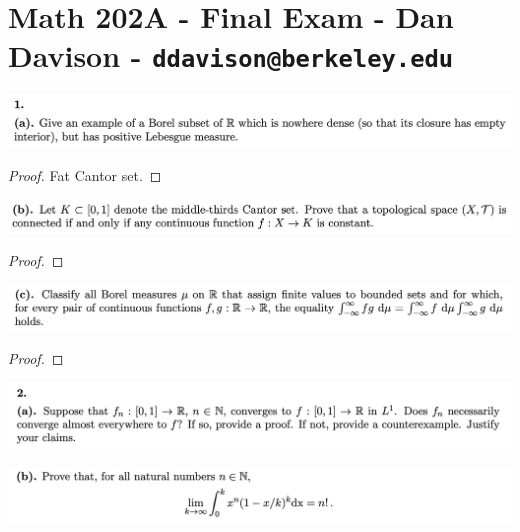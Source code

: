 \section*{Math 202A - Final Exam - Dan Davison - \texttt{ddavison@berkeley.edu}}

\begin{mdframed}
\includegraphics[width=400pt]{img/analysis--berkeley-202a-final-c9d2.png}
\end{mdframed}

\begin{proof}
  Fat Cantor set.
\end{proof}

\begin{mdframed}
\includegraphics[width=400pt]{img/analysis--berkeley-202a-final-4333.png}
\end{mdframed}

\begin{proof}
\end{proof}

\begin{mdframed}
\includegraphics[width=400pt]{img/analysis--berkeley-202a-final-0bf8.png}
\end{mdframed}

\begin{proof}
\end{proof}

\newpage
\begin{mdframed}
\includegraphics[width=400pt]{img/analysis--berkeley-202a-final-04b9.png}
\end{mdframed}

\begin{mdframed}
\includegraphics[width=400pt]{img/analysis--berkeley-202a-final-96cc.png}
\end{mdframed}



